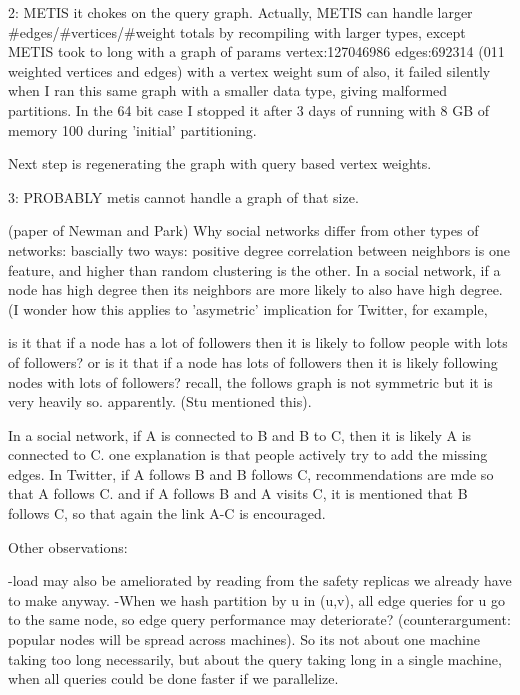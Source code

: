 \documentclass{article}
\begin{document}
2: METIS it chokes on the query graph.
Actually, METIS can handle larger #edges/#vertices/#weight totals by recompiling with larger types, 
except METIS took to long with a graph of params vertex:127046986  edges:692314 (011 weighted vertices and edges)  with a vertex weight sum of
also, it failed silently when I ran this same graph with a smaller data type, giving malformed partitions.
In the 64 bit case I stopped it after 3 days of running with 8 GB of memory 100%
during 'initial' partitioning.

Next step is regenerating the graph with query based vertex weights.


3: PROBABLY metis cannot handle a graph of that size.


(paper of Newman and Park) Why social networks differ from other types of networks:
bascially two ways: positive degree correlation between neighbors is one feature, and higher than random clustering is the other.
In a social network, if a node has high degree then its neighbors are more likely to also have  high degree. 
(I wonder how this applies to 'asymetric' implication for Twitter, for example, 

is it that if a node has a lot of followers then it is likely to follow people with lots of followers?
or is it that if a node has lots of followers then it is likely following nodes with lots of followers?
recall, the follows graph is not symmetric but it is very heavily so. apparently. (Stu mentioned this).
 
In a social network, if A is connected to B and B to C, then it is likely A is connected to C. one explanation is
that people actively try to add the missing edges.  In Twitter, if A follows B and B follows C, recommendations are mde
so that A follows C. and if A follows B and A visits C, it is mentioned that B follows C, so that again the link A-C is encouraged.


Other observations:

-load may also be ameliorated by reading from the safety replicas we already have to make anyway.
-When we hash partition by u in (u,v), all edge queries for  u go to the same node, so edge query performance may deteriorate?
(counterargument: popular nodes will be spread across machines). So its not about one machine taking too long necessarily, but
about the query taking long in a single machine, when all queries could be done faster if we parallelize.
\end{document}
